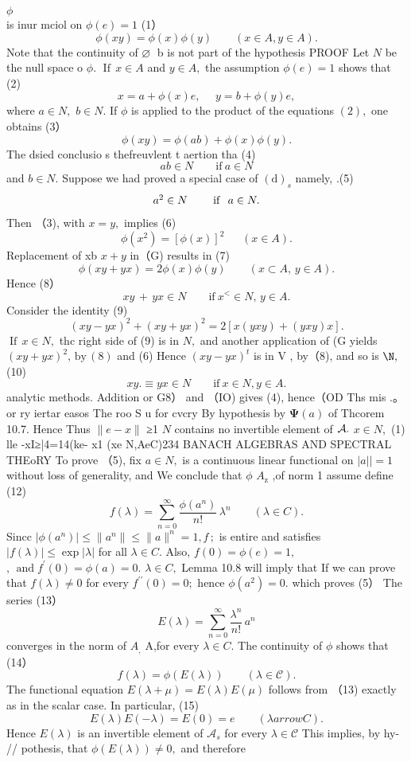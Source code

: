 $\phi~~~~~~~~~~~~~~~~~~~~~~~~~~~~~~~~~~~~~~~~~~~~~~~~~~~~~~~~~~~~~~~~~~~~~~~~~~~~~~~~~~~~~~~~~~~~~~~~~~~~~~~~~~~~~~~~~~~~~~~~~~~~~~~~~~~~~~~~~~~~~~~~~~~~~~~~~~~~~~~~~~~~~~~~~~~~~~~~~~~~~~~~~~~~~~~~~~~~~~~~~~~~~~~~~~~~~~~~~~$ is inur mciol on $\phi(e)=1$ (1） $$ \phi(x y)=\phi(x)\phi(y)\qquad(x\in A,y\in A). $$ Note that the continuity of $\varnothing\;$ b is not part of the hypothesis PROOF Let $\textstyle N$ be the null space o $\phi.$ $\operatorname{If}\,x\in A$ and $y\in A,$ the assumption $\phi(e)=1$ shows that (2) $$ x=a+\phi(x)e,\ \ \ \ \ \ y=b+\phi(y)e, $$ where $a\in N,$ $b\in N.$ If $\phi$ is applied to the product of the equations $(2),$ one obtains (3） $$ \phi(x y)=\phi(a b)+\phi(x)\phi(y). $$ The dsied conclusio s thefreuvlent t aertion tha (4) $$ a b\in N\qquad{\mathrm{if~}}a\in N $$ and $b\in N.$ Suppose we had proved a special case of $(\mathrm{d})_{s}$ namely, .(5) $$ \begin{array}{c c c}{{a^{2}\in N}}&{{}}&{{\mathrm{~if~}\ a\in N.}}\end{array} $$ Then （3), with $x=y,$ implies (6) $$ \phi(x^{2})=[\phi(x)]^{2}~~~~~~~(x\in A). $$ Replacement of xb $x+y$ in（G) results in (7) $$ \phi(x y+y x)=2\phi(x)\phi(y)\qquad(x\subset A,\,y\in A). $$ Hence (8） $$ x y\,+\,y x\in N\qquad{\mathrm{if~}}x^{<}\in N,\,y\in A. $$ Consider the identity (9) $$ (x y-y x)^{2}+(x y+y x)^{2}=2[x(y x y)+(y x y)x]. $$ $\operatorname{If}\,x\in N,$ thc right side of (9) is in $N,$ and another application of (G yields $(x y+y x)^{2},\,\mathrm{by}\,(8)$ and (6) Hence $(x y-y x)^{t}$ is in V , by（8), and so is ${\N},$ (10) $$ x y.\equiv y x\in N\qquad{\mathrm{if~}}x\in N,y\in A. $$ analytic methods. Addition or G8） and （IO) gives (4), hence（OD Ths mis .。or ry iertar easos The roo S u for cvcry By hypothesis by $\mathbf{\Psi}(a)$ of Thcorem 10.7. Hence Thus $\|e-x\|$ ≥1 $\textstyle N$ contains no invertible element of ${\cal A}.$ $x\in N,$ (1) lle -xI≥|4=14(ke- x1 (xe N,AeC)234 BANACH ALGEBRAS AND SPECTRAL THEoRY To prove （5), fix $a\in N,$ is a continuous linear functional on $|a||=1$ without loss of generality, and We conclude that $\phi$ $A_{\mathrm{{z}}}$ ,of norm 1 assume define (12) $$ f(\lambda)=\sum_{n=0}^{\infty}\frac{\phi(a^{n})}{n!}\,\lambda^{n}\qquad(\lambda\in C). $$ Sincc $|\phi(a^{n})|\leq\|a^{n}\|\leq\|a\|^{n}=1,f\,;$ is entire and satisfies $|f(\lambda)|\leq\exp|\lambda|$ for all $\lambda\in C.$ Also, $f(0)=\phi(e)=1,$ $,\,\operatorname{and}f^{\prime}(0)=\phi(a)=0.$ $\lambda\in C,$ Lemma 10.8 will imply that If we can prove that $f(\lambda)\neq0$ for every $f^{\prime\prime}(0)=0;$ hence $\phi(a^{2})=0.$ which proves (5） The series (13） $$ E(\lambda)=\sum_{n=0}^{\infty}{\frac{\lambda^{n}}{n!}}\,a^{n} $$ converges in the norm of $A_{\mathrm{{,}}}$ A,for every $\lambda\in C.$ The continuity of $\phi$ shows that (14） $$ f(\lambda)=\phi(E(\lambda))\qquad(\lambda\in{\mathcal{C}}). $$ The functional equation $E(\lambda+\mu)=E(\lambda)E(\mu)$ follows from （13) exactly as in the scalar case. In particular, (15) $$ E(\lambda)E(-\lambda)=E(0)=e\qquad(\lambda arrow C). $$ Hence $\scriptstyle{E(\lambda)}$ is an invertible element of ${\mathcal{A}}_{s}$ for every $\lambda\in{\mathcal{C}}$ This implies, by hy- // pothesis, that $\phi(E(\lambda))\neq0,$ and therefore 